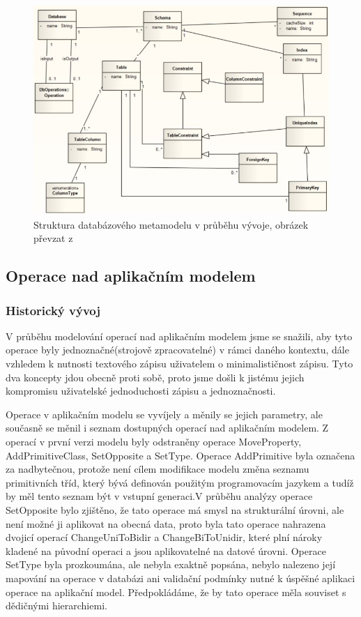 \documentclass[11pt,twoside,a4paper]{book}
\begin{document}
\begin{figure}[ht]
\begin{center}
\includegraphics[width=15cm]{figures/rdb_structure_lukes}
\caption{Struktura databázového metamodelu v průběhu vývoje, obrázek převzat z
\cite{Lukes}}
\label{fig:rdb_str_lukes}
\end{center}
\end{figure}


\subsection{Operace nad aplikačním modelem}


\subsubsection{Historický vývoj}

V průběhu modelování operací nad aplikačním modelem jsme se snažili, aby tyto
operace byly jednoznačné(strojově zpracovatelné) v rámci daného kontextu, dále
vzhledem k nutnosti textového zápisu uživatelem o minimalističnost zápisu. Tyto
dva koncepty jdou obecně proti sobě, proto jsme došli k jistému jejich
kompromisu uživatelské jednoduchosti zápisu a jednoznačnosti.

Operace v aplikačním modelu se vyvíjely a měnily se jejich parametry, ale
současně se měnil i seznam dostupných operací nad aplikačním modelem. Z operací
v první verzi modelu byly odstraněny operace MoveProperty, AddPrimitiveClass,
SetOpposite a SetType. Operace AddPrimitive byla označena za nadbytečnou,
protože není cílem modifikace modelu změna seznamu primitivních tříd, který
bývá definován použitým programovacím jazykem a tudíž by měl tento seznam být v
vstupní generaci.V průběhu analýzy operace SetOpposite bylo zjištěno, že tato
operace má smysl na strukturální úrovni, ale není možné ji aplikovat na obecná
data, proto byla tato operace nahrazena dvojicí operací ChangeUniToBidir a
ChangeBiToUnidir, které plní nároky kladené na původní operaci a jsou
aplikovatelné  na datové úrovni. Operace SetType byla prozkoumána, ale nebyla
exaktně popsána, nebylo nalezeno její mapování na operace v databázi ani
validační podmínky nutné k úspěšné aplikaci operace na aplikační model.
Předpokládáme, že by tato operace měla souviset s dědičnými hierarchiemi.
\end{document}
